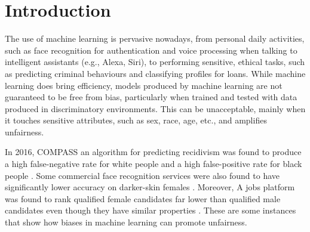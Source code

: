 \documentclass[sigconf,review]{acmart}
\begin{document}
	
	
	\maketitle
	
	\section{Introduction}
	\label{sec:introduction}
	The use of machine learning is pervasive nowadays, from personal daily activities, such as face recognition for authentication and voice processing when talking to intelligent assistants (e.g., Alexa, Siri), to performing sensitive, ethical tasks, such as predicting criminal behaviours and classifying profiles for loans. While machine learning does bring efficiency, models produced by machine learning are not guaranteed to be free from bias, particularly when trained and tested with data produced in discriminatory environments. This can be unacceptable, mainly when it touches sensitive attributes, such as sex, race, age, etc., and amplifies unfairness. 
	
	In 2016, COMPASS an algorithm for predicting recidivism was found to produce a high false-negative rate for white people and a high false-positive rate for black people \cite{angwin2016machine}. Some commercial face recognition services were also found to have significantly lower accuracy on darker-skin females \cite{buolamwini2018gender}. Moreover, A jobs platform was found to rank qualified female candidates far lower than qualified male candidates even though they have similar properties \cite{lahoti2019ifair}. These are some instances that show how biases in machine learning can promote unfairness. 
	
\end{document}
